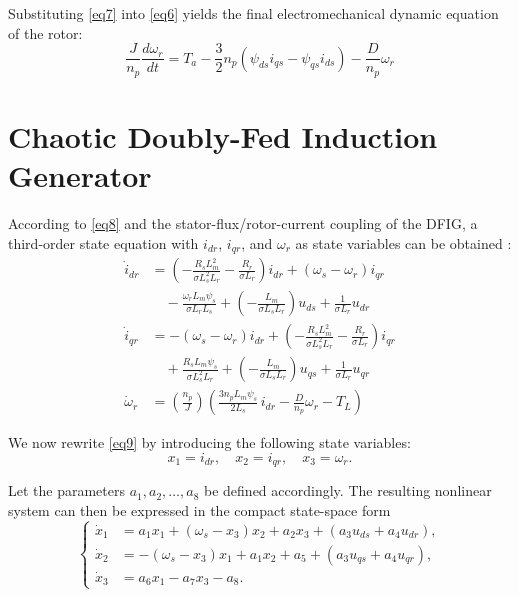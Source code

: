 \documentclass[conference]{IEEEtran}
\begin{document}
Substituting \eqref{eq7} into \eqref{eq6} yields the final electromechanical dynamic equation of the rotor:
\begin{equation}
\frac{J}{n_{p}}\frac{d\omega_{r}}{dt} = T_{a} - \frac{3}{2}n_{p}\left( \psi_{ds}i_{qs} - \psi_{qs}i_{ds} \right) - \frac{D}{n_{p}}\omega_{r}
\label{eq8}
\end{equation}

\section{Chaotic Doubly-Fed Induction Generator}

According to \eqref{eq8} and the stator-flux/rotor-current coupling of the DFIG, a third-order state equation with $i_{dr}$, $i_{qr}$, and $\omega_{r}$ as state variables can be obtained \cite{b24}:
\begin{equation}
\begin{aligned}
\dot{i}_{dr} &= \left( - \frac{R_{s}L_{m}^{2}}{\sigma L_{s}^{2}L_{r}} - \frac{R_{r}}{\sigma L_{r}} \right)i_{dr} + \left( \omega_{s} - \omega_{r} \right)i_{qr} \\
&\quad- \frac{\omega_{r}L_{m}\psi_{s}}{\sigma L_{r}L_{s}} + \left( - \frac{L_{m}}{\sigma L_{s}L_{r}} \right)u_{ds} + \frac{1}{\sigma L_{r}}u_{dr} \\[4pt]
\dot{i}_{qr} &= - \left( \omega_{s} - \omega_{r} \right)i_{dr} + \left( - \frac{R_{s}L_{m}^{2}}{\sigma L_{s}^{2}L_{r}} - \frac{R_{r}}{\sigma L_{r}} \right)i_{qr} \\
&\quad+ \frac{R_{s}L_{m}\psi_{s}}{\sigma L_{s}^{2}L_{r}} + \left( - \frac{L_{m}}{\sigma L_{s}L_{r}} \right)u_{qs} + \frac{1}{\sigma L_{r}}u_{qr} \\[4pt]
\dot{\omega}_{r} &= \left( \frac{n_{p}}{J} \right)\left( \frac{3n_{p}L_{m}\psi_{s}}{2L_{s}}\, i_{dr} - \frac{D}{n_{p}}\omega_{r} - T_{L} \right)
\end{aligned}
\label{eq9}
\end{equation}

We now rewrite \eqref{eq9} by introducing the following state variables:
\begin{equation*}
x_{1} = i_{dr},\quad x_{2} = i_{qr},\quad x_{3} = \omega_{r}.
\end{equation*}

Let the parameters $a_{1},a_{2},\ldots,a_{8}$ be defined accordingly. The resulting nonlinear system can then be expressed in the compact state-space form
\begin{equation}
\left\{ \begin{aligned}
\dot{x}_{1} &= a_{1}x_{1} + \left( \omega_{s} - x_{3} \right)x_{2} + a_{2}x_{3} + \left( a_{3}u_{ds} + a_{4}u_{dr} \right), \\
\dot{x}_{2} &= - \left( \omega_{s} - x_{3} \right)x_{1} + a_{1}x_{2} + a_{5} + \left( a_{3}u_{qs} + a_{4}u_{qr} \right), \\
\dot{x}_{3} &= a_{6}x_{1} - a_{7}x_{3} - a_{8}.
\end{aligned} \right.
\label{eq10}
\end{equation}
\end{document}
